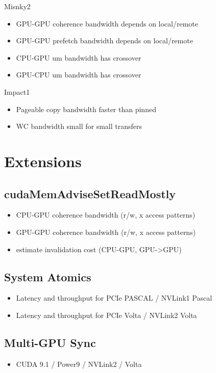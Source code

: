 Misnky2
\begin{itemize}
\item GPU-GPU coherence bandwidth depends on local/remote
\item GPU-GPU prefetch bandwidth depends on local/remote
\item CPU-GPU um bandwidth has crossover
\item GPU-CPU um bandwidth has crossover
\end{itemize}

Impact1
\begin{itemize}
    \item Pageable copy bandwidth faster than pinned
    \item WC bandwidth small for small transfers
\end{itemize}


\section{Extensions}
\subsection{cudaMemAdviseSetReadMostly}
\begin{itemize}
    \item CPU-GPU coherence bandwidth (r/w, x access patterns)
    \item GPU-GPU coherence bandwidth (r/w, x access patterns)
    \item estimate invalidation cost (CPU-GPU, GPU->GPU)
\end{itemize}

\subsection{System Atomics}
\begin{itemize}
    \item Latency and throughput for PCIe PASCAL / NVLink1 Pascal 
    \item Latency and throughput for PCIe Volta / NVLink2 Volta
\end{itemize}

\subsection{Multi-GPU Sync}
\begin{itemize}
    \item CUDA 9.1 / Power9 / NVLink2 / Volta
\end{itemize}


